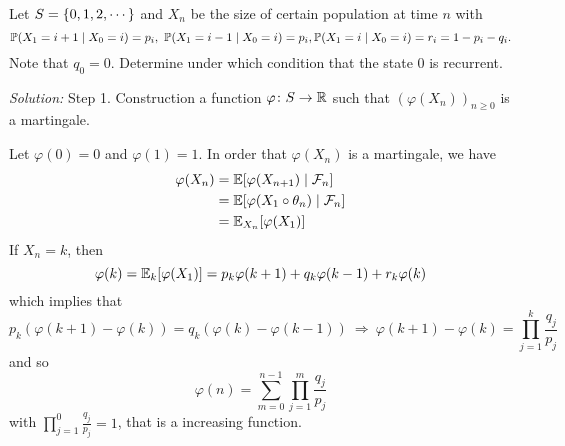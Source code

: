 \begin{exam}
    Let $S = \left\{0,1,2,\cdots\right\}$ and $X_n$ be the size of certain population at time $n$ with
    \begin{equation*}
        \mathbb{P}(X_1 = i+1 \mid X_0 = i) = p_i,~\mathbb{P}(X_1 = i-1 \mid X_0 = i) = p_i, \mathbb{P}(X_1 = i \mid X_0 = i) = r_i = 1- p_i - q_i.
    \end{equation*}
    Note that $q_0 = 0$. Determine under which condition that the state $0$ is recurrent.

    \noindent \emph{Solution:} Step 1. Construction a function $\varphi \colon S \rightarrow \mathbb{R}$ such that $(\varphi(X_n))_{n \geq 0}$ is a martingale.

    \noindent Let $\varphi(0) = 0$ and $\varphi(1) = 1$. In order that $\varphi(X_n)$ is a martingale, we have
    \begin{equation*}
        \begin{aligned}
            \varphi(X_n) &= \mathbb{E}[\varphi(X_{n+1}) \mid \mathcal{F}_n]\\
            &=\mathbb{E}[\varphi(X_1 \circ \theta_n) \mid \mathcal{F}_n] \\
            &=\mathbb{E}_{X_n}[\varphi(X_1)]
        \end{aligned}
    \end{equation*}
    If $X_n = k$, then
    \begin{equation*}
        \varphi(k) = \mathbb{E}_k[\varphi(X_1)] = p_k\varphi(k+1)+q_k\varphi(k-1)+r_k\varphi(k)
    \end{equation*}
    which implies that
    \begin{equation*}
        p_k(\varphi(k+1) - \varphi(k)) = q_k (\varphi(k) - \varphi(k-1))~\Rightarrow~ \varphi(k+1) - \varphi(k) = \prod_{j=1}^k\frac{q_j}{p_j}
    \end{equation*}
    and so
    \begin{equation*}
        \varphi(n) = \sum_{m=0}^{n-1}\prod_{j=1}^m\frac{q_j}{p_j}
    \end{equation*}
    with $\prod_{j=1}^0\frac{q_j}{p_j} = 1$, that is a increasing function. 


\end{exam}
